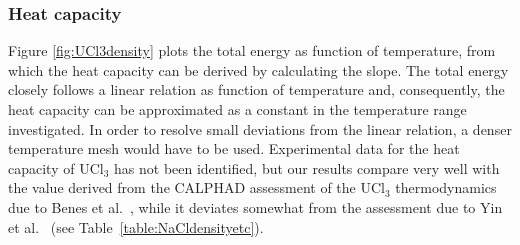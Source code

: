 \documentclass[preprint,3p,10pt,twocolumn,number,sort&compress]{elsarticle}
\begin{document}
\subsubsection{Heat capacity} 
Figure \ref{fig:UCl3density} plots the total energy as function of temperature, from which the heat capacity can be derived by calculating the slope. The total energy closely follows a linear relation as function of temperature and, consequently, the heat capacity can be approximated as a constant in the temperature range investigated. In order to resolve small deviations from the linear relation, a denser temperature mesh would have to be used. 
Experimental data for the heat capacity of UCl$_3$ has not been identified, but our results compare very well with the value derived from the CALPHAD assessment of the UCl$_3$ thermodynamics due to Benes et al.~\cite{BENES2008}, while it deviates somewhat from the assessment due to Yin et al.~\cite{YIN2020} (see Table~\ref{table:NaCldensityetc}). %


\end{document}
